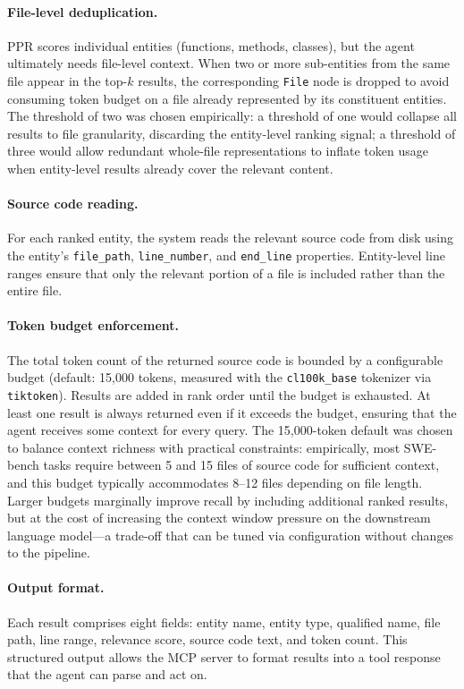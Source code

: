\paragraph{File-level deduplication.} PPR scores individual entities (functions, methods, classes), but the agent ultimately needs file-level context. When two or more sub-entities from the same file appear in the top-$k$ results, the corresponding \texttt{File} node is dropped to avoid consuming token budget on a file already represented by its constituent entities. The threshold of two was chosen empirically: a threshold of one would collapse all results to file granularity, discarding the entity-level ranking signal; a threshold of three would allow redundant whole-file representations to inflate token usage when entity-level results already cover the relevant content.

\paragraph{Source code reading.} For each ranked entity, the system reads the relevant source code from disk using the entity's \texttt{file\_path}, \texttt{line\_number}, and \texttt{end\_line} properties. Entity-level line ranges ensure that only the relevant portion of a file is included rather than the entire file.

\paragraph{Token budget enforcement.} The total token count of the returned source code is bounded by a configurable budget (default: 15{,}000 tokens, measured with the \texttt{cl100k\_base} tokenizer via \texttt{tiktoken}). Results are added in rank order until the budget is exhausted. At least one result is always returned even if it exceeds the budget, ensuring that the agent receives some context for every query. The 15{,}000-token default was chosen to balance context richness with practical constraints: empirically, most SWE-bench tasks require between 5 and 15 files of source code for sufficient context, and this budget typically accommodates 8--12 files depending on file length. Larger budgets marginally improve recall by including additional ranked results, but at the cost of increasing the context window pressure on the downstream language model---a trade-off that can be tuned via configuration without changes to the pipeline.

\paragraph{Output format.} Each result comprises eight fields: entity name, entity type, qualified name, file path, line range, relevance score, source code text, and token count. This structured output allows the MCP server to format results into a tool response that the agent can parse and act on.


